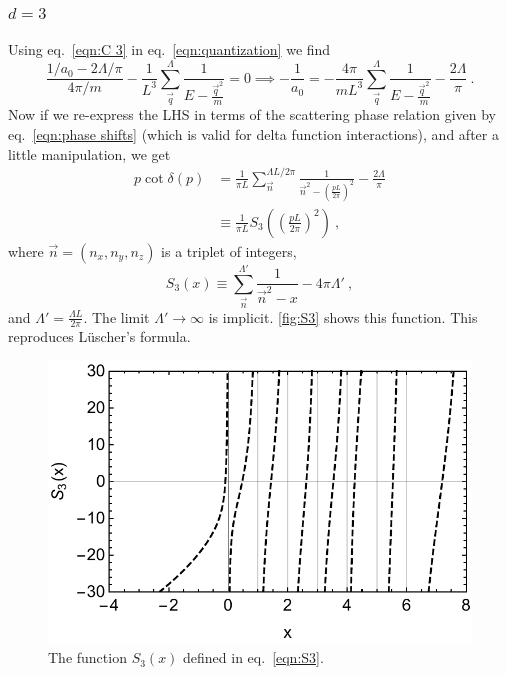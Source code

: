 \documentclass[11pt]{article}
\begin{document}
\subsubsection{$d=3$}
Using eq.~\eqref{eqn:C 3} in eq.~\eqref{eqn:quantization} we find
\begin{equation}
\frac{1/a_0-2\Lambda/\pi}{4\pi/m}-\frac{1}{L^3}\sum_{\vec{q}}^\Lambda \frac { 1 } { E - \frac{\vec{q}^2}{m} }=0
\implies-\frac{1}{a_0}=-\frac{4\pi}{mL^3}\sum_{\vec{q}}^\Lambda \frac { 1 } { E - \frac{\vec{q}^2}{m} }-\frac{2\Lambda}{\pi}\ .
\end{equation}
Now if we re-express the LHS in terms of the scattering phase relation given by eq.~\eqref{eqn:phase shifts} (which is valid for delta function interactions), and after a little manipulation, we get
\begin{align}
p\cot \delta(p)&=\frac{1}{\pi L}\sum_{\vec{n}}^{\Lambda L/2\pi} \frac { 1 } { \vec{n}^2 -\left(\frac{pL}{2\pi}\right)^2}-\frac{2\Lambda}{\pi}\\
&\equiv \frac{1}{\pi L}S_3\left(\left(\frac{pL}{2\pi}\right)^2\right)\ ,
\end{align}
where $\vec{n}=(n_x,n_y,n_z)$ is a triplet of integers, 
\begin{equation}\label{eqn:S3}
S_3(x)\equiv\sum_{\vec{n}}^{\Lambda'} \frac { 1 } { \vec{n}^2 -x}-4\pi\Lambda'\ ,
\end{equation}
and $\Lambda'=\frac{\Lambda L}{2\pi}$.  The limit $\Lambda'\to\infty$ is implicit.  \autoref{fig:S3} shows this function. This reproduces L\"uscher's formula. 
\begin{figure}
\center
\includegraphics[width=.8\columnwidth]{figure/S3.pdf}
\caption{The function $S_3(x)$ defined in eq.~\eqref{eqn:S3}.\label{fig:S3}}
\end{figure}
\end{document}
